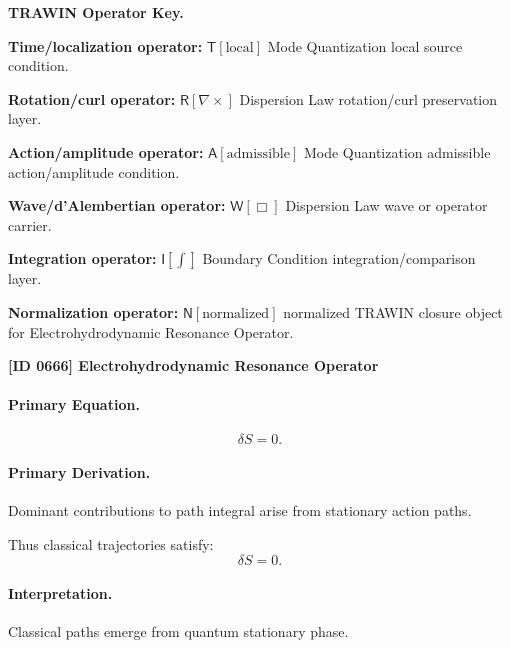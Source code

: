 \par\vspace{0.45\baselineskip}
\noindent\begin{minipage}[t]{\linewidth}
\begingroup
\small
\raggedright
\textbf{TRAWIN Operator Key.}\par
\noindent\textbf{Time/localization operator:} $\mathsf{T}\!\left[\mathrm{local}\right]$ Mode Quantization local source condition.\par
\noindent\textbf{Rotation/curl operator:} $\mathsf{R}\!\left[\nabla\times\right]$ Dispersion Law rotation/curl preservation layer.\par
\noindent\textbf{Action/amplitude operator:} $\mathsf{A}\!\left[\mathrm{admissible}\right]$ Mode Quantization admissible action/amplitude condition.\par
\noindent\textbf{Wave/d'Alembertian operator:} $\mathsf{W}\!\left[\Box\right]$ Dispersion Law wave or operator carrier.\par
\noindent\textbf{Integration operator:} $\mathsf{I}\!\left[\int\right]$ Boundary Condition integration/comparison layer.\par
\noindent\textbf{Normalization operator:} $\mathsf{N}\!\left[\mathrm{normalized}\right]$ normalized TRAWIN closure object for Electrohydrodynamic Resonance Operator.\par
\endgroup
\end{minipage}

\clearpage
\noindent\textbf{[ID 0666] Electrohydrodynamic Resonance Operator}\par
\vspace{0.35em}
\paragraph{Primary Equation.}
\begin{equation}
\delta S = 0.
\end{equation}

\paragraph{Primary Derivation.}
Dominant contributions to path integral arise from stationary action paths.

Thus classical trajectories satisfy:
\begin{equation}
\boxed{\delta S = 0.}
\end{equation}

\paragraph{Interpretation.}
Classical paths emerge from quantum stationary phase.

